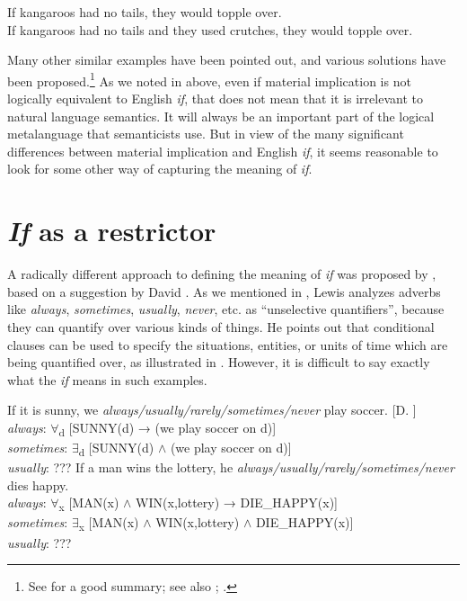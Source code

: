 \ea
\ea If kangaroos had no tails, they would topple over.\\
\ex If kangaroos had no tails and they used crutches, they would topple over.
                       \z
\z


Many other similar examples have been pointed out, and various solutions have been proposed.\footnote{See  for a good summary; see also \citet[83-87]{Gazdar1979}; \citet[ch2--3]{Bennett2003}.} As we noted in  above, even if material implication is not logically equivalent to English \textit{if}, that does not mean that it is irrelevant to natural language semantics. It will always be an important part of the logical metalanguage that semanticists use. But in view of the many significant differences between material implication and English \textit{if}, it seems reasonable to look for some other way of capturing the meaning of \textit{if}.


\section{\textit{If} as a restrictor}\label{sec:19.5}

A radically different approach to defining the meaning of \textit{if} was proposed by \citet{Kratzer1986}, based on a suggestion by David \citet{Lewis1975}. As we mentioned in , Lewis analyzes adverbs like \textit{always}, \textit{sometimes}, \textit{usually}, \textit{never}, etc. as “unselective quantifiers”, because they can quantify over various kinds of things. He points out that conditional clauses can be used to specify the situations, entities, or units of time which are being quantified over, as illustrated in . However, it is difficult to say exactly what the \textit{if} means in such examples.


\ea
\ea  If it is sunny, we \textit{always/usually/rarely/sometimes/never} play soccer. [D. \citealt{Lewis1975}]\\
\textit{always}: ${\forall}$\textsubscript{d} [SUNNY(d) → (we play soccer on d)]\\
\textit{sometimes}: ${\exists}$\textsubscript{d} [SUNNY(d) $\wedge$ (we play soccer on d)]\\
\textit{usually}: ???
\ex  If a man wins the lottery, he \textit{always/usually/rarely/sometimes/never} dies happy.\\
\textit{always}: ${\forall}$\textsubscript{x} [MAN(x) $\wedge$ WIN(x,lottery) → DIE\_HAPPY(x)]\\
\textit{sometimes}: ${\exists}$\textsubscript{x} [MAN(x) $\wedge$ WIN(x,lottery) $\wedge$ DIE\_HAPPY(x)]\\
\textit{usually}: ???
\z \z


